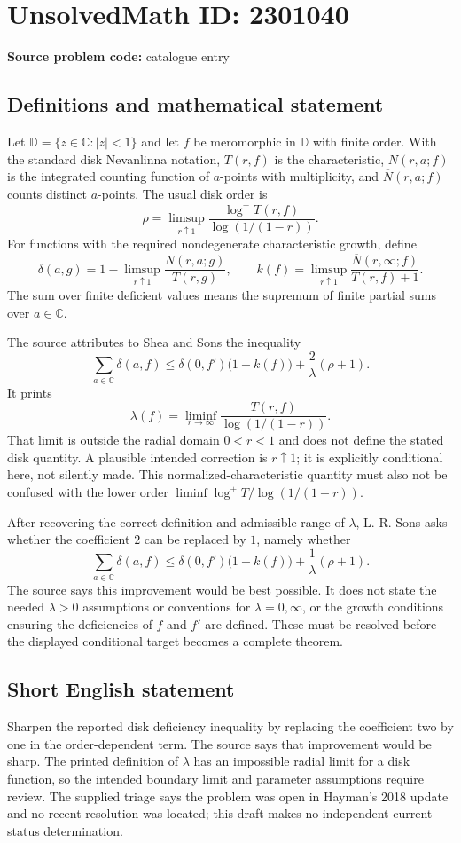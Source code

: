 \documentclass[11pt]{article}
\newcommand{\C}{\mathbb{C}}
\begin{document}
\section*{UnsolvedMath ID: 2301040}
\textbf{Source problem code:} catalogue entry
\subsection{Definitions and mathematical statement}
Let $\mathbb D=\{z\in\C:|z|<1\}$ and let $f$ be meromorphic in $\mathbb D$ with finite order. With the standard disk Nevanlinna notation, $T(r,f)$ is the characteristic, $N(r,a;f)$ is the integrated counting function of $a$-points with multiplicity, and $\overline N(r,a;f)$ counts distinct $a$-points. The usual disk order is
\[
 \rho=\limsup_{r\uparrow1}\frac{\log^+T(r,f)}{\log(1/(1-r))}.
\]
For functions with the required nondegenerate characteristic growth, define
\[
 \delta(a,g)=1-\limsup_{r\uparrow1}\frac{N(r,a;g)}{T(r,g)},\qquad
 k(f)=\limsup_{r\uparrow1}\frac{\overline N(r,\infty;f)}{T(r,f)+1}.
\]
The sum over finite deficient values means the supremum of finite partial sums over $a\in\C$.

The source attributes to Shea and Sons the inequality
\[
 \sum_{a\in\C}\delta(a,f)
 \leq \delta(0,f')\bigl(1+k(f)\bigr)+\frac{2}{\lambda}(\rho+1).
\]
It prints
\[
 \lambda(f)=\liminf_{r\to\infty}
 \frac{T(r,f)}{\log(1/(1-r))}.
\]
That limit is outside the radial domain $0<r<1$ and does not define the stated disk quantity. A plausible intended correction is $r\uparrow1$; it is explicitly conditional here, not silently made. This normalized-characteristic quantity must also not be confused with the lower order $\liminf\log^+T/\log(1/(1-r))$.

After recovering the correct definition and admissible range of $\lambda$, L. R. Sons asks whether the coefficient $2$ can be replaced by $1$, namely whether
\[
 \sum_{a\in\C}\delta(a,f)
 \leq \delta(0,f')\bigl(1+k(f)\bigr)+\frac{1}{\lambda}(\rho+1).
\]
The source says this improvement would be best possible. It does not state the needed $\lambda>0$ assumptions or conventions for $\lambda=0,\infty$, or the growth conditions ensuring the deficiencies of $f$ and $f'$ are defined. These must be resolved before the displayed conditional target becomes a complete theorem.
\subsection{Short English statement}
Sharpen the reported disk deficiency inequality by replacing the coefficient two by one in the order-dependent term. The source says that improvement would be sharp. The printed definition of $\lambda$ has an impossible radial limit for a disk function, so the intended boundary limit and parameter assumptions require review. The supplied triage says the problem was open in Hayman's 2018 update and no recent resolution was located; this draft makes no independent current-status determination.
\end{document}
